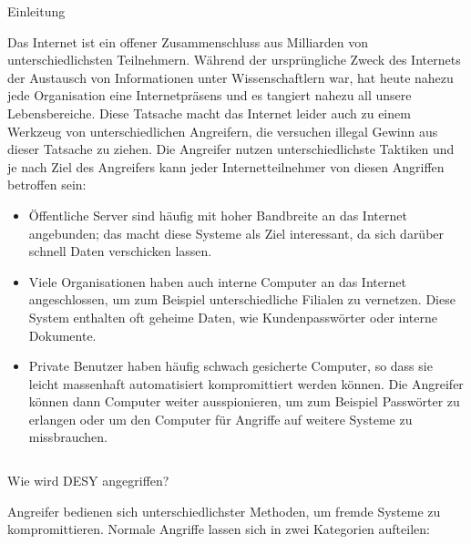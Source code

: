 \documentclass[final]{beamer}
\newlength{\sepwid}
\newlength{\twocolwid}
\begin{document}
\begin{frame}[t]
\begin{columns}[t, totalwidth=\textwidth]
\begin{column}{\twocolwid}
\begin{block}{Einleitung}

Das Internet ist ein offener Zusammenschluss aus Milliarden von unterschiedlichsten
Teilnehmern. Während der ursprüngliche Zweck des Internets der Austausch von Informationen
unter Wissenschaftlern war, hat heute nahezu jede Organisation eine Internetpräsens und
es tangiert nahezu all unsere Lebensbereiche. Diese Tatsache macht das Internet leider auch
zu einem Werkzeug von unterschiedlichen Angreifern, die versuchen illegal Gewinn aus dieser
Tatsache zu ziehen.
Die Angreifer nutzen unterschiedlichste Taktiken und je nach Ziel des Angreifers kann jeder
Internetteilnehmer von diesen Angriffen betroffen sein:

\begin{itemize}
 \item Öffentliche Server sind häufig mit hoher Bandbreite an das Internet angebunden; das 
 macht diese Systeme als Ziel interessant, da sich darüber schnell Daten verschicken lassen.
 \item Viele Organisationen haben auch interne Computer an das Internet angeschlossen, um 
 zum Beispiel unterschiedliche Filialen zu vernetzen. Diese System enthalten oft geheime Daten, 
 wie Kundenpasswörter oder interne Dokumente.
 \item Private Benutzer haben häufig schwach gesicherte Computer, so dass sie leicht massenhaft
 automatisiert kompromittiert werden können. Die Angreifer können dann Computer weiter ausspionieren, 
 um zum Beispiel Passwörter zu erlangen oder um den Computer für Angriffe auf weitere Systeme 
 zu missbrauchen.
\end{itemize}

\end{block}


\begin{column}{\sepwid}\end{column} %


\begin{block}{Wie wird DESY angegriffen?}

Angreifer bedienen sich unterschiedlichster Methoden, um fremde Systeme zu 
kompromittieren. Normale Angriffe lassen sich in zwei Kategorien aufteilen:


\end{block}
\end{column}
\end{columns}
\end{frame}
\end{document}
